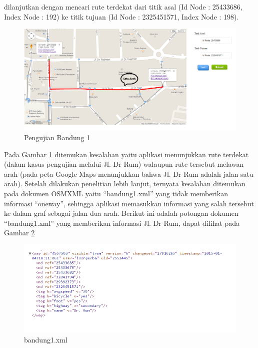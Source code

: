 dilanjutkan dengan mencari rute terdekat dari titik asal (Id Node : 25433686,
Index Node : 192) ke titik tujuan (Id Node : 2325451571, Index Node : 198).
\begin{figure}[h]
\centering
\includegraphics[scale=0.45]{Gambar/pu_bandung1_rute}
\caption[Pengujian Bandung 1]{Pengujian Bandung 1}
\label{fig:pu_bandung1_rute}
\end{figure}
Pada Gambar \ref{fig:pu_bandung1_rute} ditemukan kesalahan yaitu aplikasi
menunjukkan rute terdekat (dalam kasus pengujian melalui Jl. Dr Rum) walaupun
rute tersebut melawan arah (pada peta Google Maps menunjukkan bahwa Jl. Dr Rum
adalah jalan satu arah). Setelah dilakukan penelitian lebih lanjut, ternyata kesalahan
ditemukan pada dokumen OSMXML yaitu ``bandung1.xml'' yang tidak memberikan
informasi ``oneway'', sehingga aplikasi memasukkan informasi yang salah tersebut
ke dalam graf sebagai jalan dua arah. Berikut ini adalah potongan dokumen
``bandung1.xml'' yang memberikan informasi Jl. Dr Rum, dapat dilihat pada Gambar
\ref{fig:bandung1_xml} 
\begin{figure}[h]
\centering
\includegraphics[scale=0.7]{Gambar/bandung1_xml}
\caption[bandung1.xml]{bandung1.xml}
\label{fig:bandung1_xml}
\end{figure}

